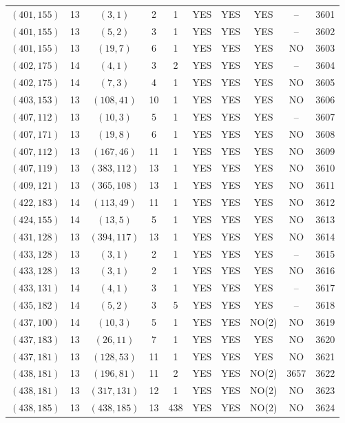 \begin{longtable}{|c|c|c|c|c|c|c|c|c|c|}
$(401, 155)$ & 13 & $(3, 1)$ & 2 & 1 & YES & YES & YES & -- & 3601\\
$(401, 155)$ & 13 & $(5, 2)$ & 3 & 1 & YES & YES & YES & -- & 3602\\
$(401, 155)$ & 13 & $(19, 7)$ & 6 & 1 & YES & YES & YES & NO & 3603\\
$(402, 175)$ & 14 & $(4, 1)$ & 3 & 2 & YES & YES & YES & -- & 3604\\
$(402, 175)$ & 14 & $(7, 3)$ & 4 & 1 & YES & YES & YES & NO & 3605\\
$(403, 153)$ & 13 & $(108, 41)$ & 10 & 1 & YES & YES & YES & NO & 3606\\
$(407, 112)$ & 13 & $(10, 3)$ & 5 & 1 & YES & YES & YES & -- & 3607\\
$(407, 171)$ & 13 & $(19, 8)$ & 6 & 1 & YES & YES & YES & NO & 3608\\
$(407, 112)$ & 13 & $(167, 46)$ & 11 & 1 & YES & YES & YES & NO & 3609\\
$(407, 119)$ & 13 & $(383, 112)$ & 13 & 1 & YES & YES & YES & NO & 3610\\
$(409, 121)$ & 13 & $(365, 108)$ & 13 & 1 & YES & YES & YES & NO & 3611\\
$(422, 183)$ & 14 & $(113, 49)$ & 11 & 1 & YES & YES & YES & NO & 3612\\
$(424, 155)$ & 14 & $(13, 5)$ & 5 & 1 & YES & YES & YES & NO & 3613\\
$(431, 128)$ & 13 & $(394, 117)$ & 13 & 1 & YES & YES & YES & NO & 3614\\
$(433, 128)$ & 13 & $(3, 1)$ & 2 & 1 & YES & YES & YES & -- & 3615\\
$(433, 128)$ & 13 & $(3, 1)$ & 2 & 1 & YES & YES & YES & NO & 3616\\
$(433, 131)$ & 14 & $(4, 1)$ & 3 & 1 & YES & YES & YES & -- & 3617\\
$(435, 182)$ & 14 & $(5, 2)$ & 3 & 5 & YES & YES & YES & -- & 3618\\
$(437, 100)$ & 14 & $(10, 3)$ & 5 & 1 & YES & YES & NO(2) & NO & 3619\\
$(437, 183)$ & 13 & $(26, 11)$ & 7 & 1 & YES & YES & YES & NO & 3620\\
$(437, 181)$ & 13 & $(128, 53)$ & 11 & 1 & YES & YES & YES & NO & 3621\\
$(438, 181)$ & 13 & $(196, 81)$ & 11 & 2 & YES & YES & NO(2) & 3657 & 3622\\
$(438, 181)$ & 13 & $(317, 131)$ & 12 & 1 & YES & YES & NO(2) & NO & 3623\\
$(438, 185)$ & 13 & $(438, 185)$ & 13 & 438 & YES & YES & NO(2) & NO & 3624\\

\end{longtable}
